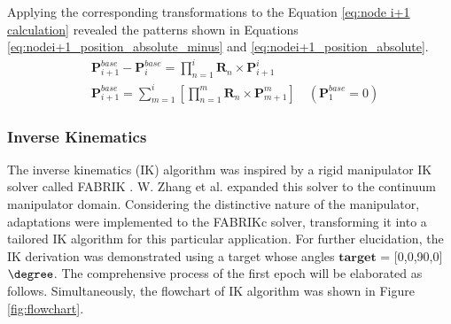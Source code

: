 Applying the corresponding transformations to the Equation \ref{eq:node i+1 calculation} revealed the patterns shown 
in Equations \ref{eq:nodei+1_position_absolute_minus} and \ref{eq:nodei+1_position_absolute}.
\begin{align}
    &\textbf{P}_{i+1}^{base} - \textbf{P}_{i}^{base} = \prod_{n=1}^{i}\textbf{R}_{n}\times \textbf{P}_{i+1}^{i} 
    \label{eq:nodei+1_position_absolute_minus} \\
    &\textbf{P}_{i+1}^{base} = \sum_{m=1}^{i}\left[\prod_{n=1}^{m}\textbf{R}_{n}\times \textbf{P}_{m+1}^{m}\right] \quad(\textbf{P}_{1}^{base} = 0)
    \label{eq:nodei+1_position_absolute}
\end{align}
\subsubsection{Inverse Kinematics}
The inverse kinematics (IK) algorithm was inspired by a rigid manipulator IK solver called FABRIK 
\cite{fabrik}. W. Zhang et al.\cite{fabrikc} expanded this solver to the continuum manipulator domain. Considering 
the distinctive nature of the manipulator, adaptations were implemented to the FABRIKc solver, transforming it 
into a tailored IK algorithm for this particular application. For further elucidation, the IK derivation was 
demonstrated using a target whose angles $\boldsymbol{target}$ = [0,0,90,0] $\degree$. The comprehensive process 
of the first epoch will be elaborated as follows. Simultaneously, the flowchart of IK algorithm was shown in 
Figure \ref{fig:flowchart}.  \\
